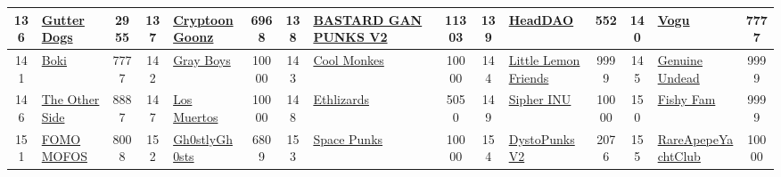 \begin{table*}[]
{\begin{tabular}{|c|l|c|c|l|c|c|l|c|c|l|c|c|l|c|}
        136   & \href{https://guttercatgang.com/}{Gutter Dogs}                                     & 2955              & 137   & \href{http://www.cryptoongoonz.com}{CryptoonGoonz}                                                & 6968              & 138   & \href{https://bastardganpunks.club}{BASTARD GAN PUNKS V2}                         & 11303             & 139   & \href{https://headdao.com/}{HeadDAO}                                          & 552               & 140   & \href{http://thevogu.io}{Vogu}                                                            & 7777                                    \\ \hline
        141   & \href{http://boki.art}{Boki}                                                       & 7777              & 142   & \href{https://grayboysnft.com/}{Gray Boys}                                                        & 10000             & 143   & \href{https://www.coolmonkes.io/}{Cool Monkes}                                    & 10000             & 144   & \href{https://www.littlelemonfriendsnft.com/}{Little Lemon Friends}           & 9999              & 145   & \href{https://www.genuineundead.io/}{Genuine Undead}                                      & 9999                                    \\ \hline
        146   & \href{http://t-o-s.io}{The Other Side}                                             & 8887              & 147   & \href{https://www.los-muertos.io/}{Los Muertos}                                                   & 10000             & 148   & \href{http://ethlizards.io}{Ethlizards}                                           & 5050              & 149   & \href{https://sipher.xyz}{Sipher INU}                                         & 10000             & 150   & \href{http://fishyfam.io}{Fishy Fam}                                                      & 9999                                    \\ \hline
        151   & \href{http://fomomofo.io}{FOMO MOFOS}                                              & 8008              & 152   & \href{http://linktr.ee/gh0stlygh0sts}{Gh0stlyGh0sts}                                              & 6809              & 153   & \href{https://www.spacepunks.club}{Space Punks}                                   & 10000             & 154   & \href{https://dystopunks.net/}{DystoPunks V2}                                 & 2076              & 155   & \href{https://www.rareapepes.com/}{RareApepeYachtClub}                                    & 10000                                   \\ \hline

\end{tabular}}
\end{table*}
